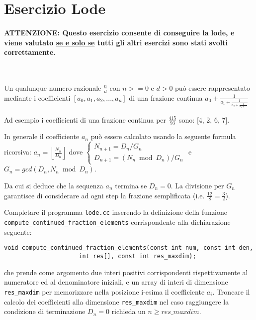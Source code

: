 \documentclass[11pt,a4paper]{article}
\begin{document}
\sloppypar

\section{Esercizio Lode}

\paragraph{ATTENZIONE: Questo esercizio consente di conseguire la
  lode, e viene valutato \underline{se e solo se} tutti gli altri
  esercizi sono stati svolti correttamente.}\ \newline

Un qualunque numero razionale $\displaystyle \frac{n}{d}$ con $n >= 0$
e $d>0$ può essere rappresentato mediante i coefficienti
$[a_0,a_1,a_2, ..., a_n]$ di una frazione continua
$\displaystyle a_0 + \frac{1}{a_1 + \frac{1}{a_2 + \frac{1}{a_3 + ...}}}$

\noindent Ad esempio i coefficienti di una frazione continua per
$\displaystyle \frac{415}{93}$ sono: [4, 2, 6, 7].

\noindent In generale il coefficiente ${\displaystyle a_{n}}$ può
essere calcolato usando la seguente formula ricorsiva:
${\displaystyle a_{n}=\left\lfloor {\frac{N_{n}}{D_{n}}}\right\rfloor}$
dove
$\displaystyle \left\{
  \begin{array}{l}
    N_{n+1}=D_{n} / G_n\\
    D_{n+1}=(N_{n}{\bmod {D}}_{n})/G_n
  \end{array}
\right.
$
e $\displaystyle G_n = gcd(D_n, N_{n}{\bmod {D}}_{n})$.

\noindent Da cui si deduce che la sequenza ${\displaystyle a_{n}}$
termina se ${\displaystyle D_{n}=0}$. La divisione per $G_n$
garantisce di considerare ad ogni step la frazione semplificata
(i.e. $\frac{12}{8} = \frac{3}{2}$).

Completare il programma \texttt{lode.cc} inserendo la definizione
della funzione \texttt{compute\_continued\_fraction\_elements}
corrispondente alla dichiarazione seguente:
%
\begin{verbatim}
void compute_continued_fraction_elements(const int num, const int den,
					 int res[], const int res_maxdim);
\end{verbatim}
%
che prende come argomento due interi positivi corrispondenti
rispettivamente al numeratore ed al denominatore iniziali, e un array
di interi di dimensione \texttt{res\_maxdim} per memorizzare nella
posizione i-esima il coefficiente $a_i$. Troncare il calcolo dei
coefficienti alla dimensione \texttt{res\_maxdim} nel caso raggiungere
la condizione di terminazione $D_n = 0$ richieda un
$n \ge res\_maxdim$.
\end{document}
